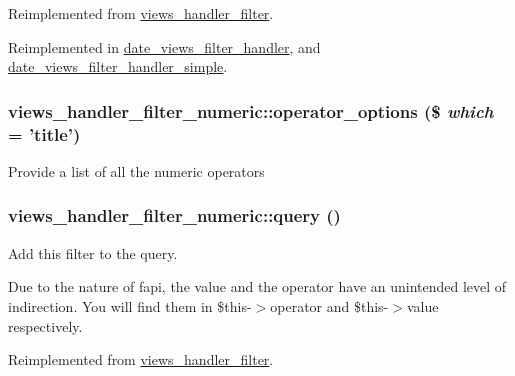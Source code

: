 Reimplemented from \hyperlink{classviews__handler__filter_a655263cd0b73188eec064b9a9743fe4c}{views\_\-handler\_\-filter}.

Reimplemented in \hyperlink{classdate__views__filter__handler_a214c46a8a095cad6ac6159cbedbb4f35}{date\_\-views\_\-filter\_\-handler}, and \hyperlink{classdate__views__filter__handler__simple_a0eb855c3f94765f6295868b81a27b9c3}{date\_\-views\_\-filter\_\-handler\_\-simple}.\hypertarget{classviews__handler__filter__numeric_a55335fe026be2bd630638382050626e6}{
\subsubsection[{operator\_\-options}]{\setlength{\rightskip}{0pt plus 5cm}views\_\-handler\_\-filter\_\-numeric::operator\_\-options (\$ {\em which} = {\ttfamily 'title'})}}
\label{classviews__handler__filter__numeric_a55335fe026be2bd630638382050626e6}
Provide a list of all the numeric operators \hypertarget{classviews__handler__filter__numeric_aaa5c6b227651bd1676850f5999f2a897}{
\subsubsection[{query}]{\setlength{\rightskip}{0pt plus 5cm}views\_\-handler\_\-filter\_\-numeric::query ()}}
\label{classviews__handler__filter__numeric_aaa5c6b227651bd1676850f5999f2a897}
Add this filter to the query.

Due to the nature of fapi, the value and the operator have an unintended level of indirection. You will find them in \$this-\/$>$operator and \$this-\/$>$value respectively. 

Reimplemented from \hyperlink{classviews__handler__filter_a8e513b3abbc2559f37b550ca4957b4ae}{views\_\-handler\_\-filter}.

